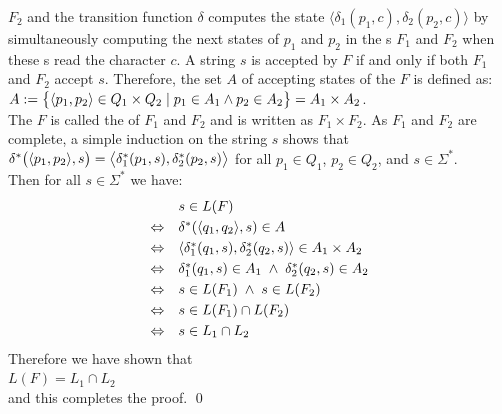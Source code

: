 $F_2$ and the transition function $\delta$ computes the state $\bigl\langle\delta_1(p_1,c), \delta_2(p_2,c)\bigr\rangle$
by simultaneously computing the next states of $p_1$ and $p_2$ in the s $F_1$ and $F_2$ when these
s read the character $c$.  A string $s$ is accepted by $F$ if and only if
both $F_1$ and  $F_2$ accept $s$.  Therefore, the set $A$ of accepting states of the  $F$ is defined as:
\\[0.2cm]
\hspace*{1.3cm}
$A := \bigl\{ \pair(p_1,p_2) \in Q_1 \times Q_2 \mid p_1 \in A_1 \wedge p_2 \in A_2 \bigr\} = A_1 \times A_2$.
\\[0.2cm]
The  $F$ is called the  of $F_1$ and $F_2$
and is written as $F_1 \times F_2$.  As $F_1$ and $F_2$ are complete, a simple induction on the string $s$ shows that
\\[0.2cm]
\hspace*{1.3cm}
$\delta^*\bigl(\pair(p_1,p_2), s\bigr) = \bigl\langle\delta_1^*(p_1,s), \delta_2^*(p_2,s)\bigr\rangle$
\quad for all $p_1 \in Q_1$, $p_2 \in Q_2$, and $s \in \Sigma^*$.
\\[0.2cm]
Then for all $s \in \Sigma^*$ we have:
$$
\begin{array}[t]{cl}
                & s \in L(F)                                                           \\[0.1cm]
\Leftrightarrow & \delta^*(\pair(q_1,q_2), s) \in A                                    \\[0.1cm]
\Leftrightarrow & \langle \delta_1^*(q_1,s), \delta_2^*(q_2, s) \rangle \in A_1 \times A_2 \\[0.1cm]
\Leftrightarrow & \delta_1^*(q_1,s) \in A_1 \;\wedge\;  \delta_2^*(q_2, s) \in A_2         \\[0.1cm]
\Leftrightarrow & s \in L(F_1) \;\wedge\;  s \in L(F_2)                                    \\[0.1cm]
\Leftrightarrow & s \in L(F_1) \cap L(F_2)                                             \\[0.1cm]
\Leftrightarrow & s \in L_1 \cap L_2                                                 
\end{array}
$$
Therefore we have shown that
\\[0.2cm]
\hspace*{1.3cm}
 $L(F) = L_1 \cap L_2$ 
\\[0.2cm]
and this completes the proof. \qed

